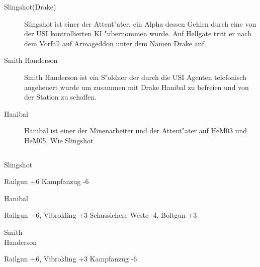 \begin{column}[l]{0.45}
    \begin{description}
        \item[Slingshot(Drake)] Slingshot ist einer der Attent"ater, ein Alpha dessen Gehirn durch eine von der USI 
            kontrollierten KI "ubernommen wurde. Auf Hellgate tritt er nach dem Vorfall auf Armageddon unter dem Namen Drake auf.
        \item[Smith Handerson] Smith Handerson ist ein S"oldner der durch die USI Agenten telefonisch angeheuert wurde um 
            zusammen mit Drake Hanibal zu befreien und von der Station zu schaffen.
        \item[Hanibal] Hanibal ist einer der Minenarbeiter und der Attent"ater auf HeM03 und HeM05. Wie Slingshot 
    \end{description}
\end{column}
\begin{column}[r]{0.45}
    \begin{nscsheet}[h]{Slingshot}
        \nscstats[ATT=3,AGG=3,EMP=3,KNO=1,HP=10]
        \nscruler
        \begin{nscinventory}
            \nscitem[Waffen] Railgun +6
            \nscitem[R"ustung] Kampfanzug -6           
        \end{nscinventory}
    \end{nscsheet}    

    \begin{nscsheet}[h]{Hanibal}
        \nscstats[ATT=4,AGG=3,EMP=3,KNO=1,HP=12]
        \nscruler
        \begin{nscinventory}
            \nscitem[Waffen] Railgun +6, Vibrokling +3
            \nscitem[R"ustung] Schussichere Weste -4, Boltgun +3           
        \end{nscinventory}
    \end{nscsheet} 

    \begin{nscsheet}[h]{Smith\\ Handerson}
        \nscstats[ATT=5,AGG=4,EMP=1,KNO=1,HP=12]
        \nscruler
        \begin{nscinventory}
            \nscitem[Waffen] Railgun +6, Vibrokling +3
            \nscitem[R"ustung] Kampfanzug -6           
        \end{nscinventory}
    \end{nscsheet}
\end{column}


\newpage
{}

